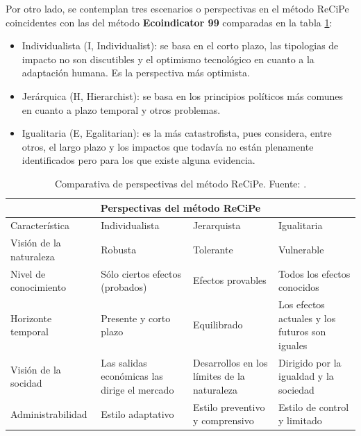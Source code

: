 Por otro lado, se contemplan tres escenarios o perspectivas en el método ReCiPe coincidentes con las del método \textbf{Ecoindicator 99} comparadas en la tabla \ref{perspectivas_recipe}:

\begin{itemize}
  \item Individualista (I, Individualist): se basa en el corto plazo, las tipologias de impacto no son discutibles y el optimismo tecnológico en cuanto a la adaptación humana. Es la perspectiva más optimista.
  \item Jerárquica (H, Hierarchist): se basa en los principios políticos más comunes en cuanto a plazo temporal y otros problemas.
  \item Igualitaria (E, Egalitarian): es la más catastrofista, pues considera, entre otros, el largo plazo y los impactos que todavía no están plenamente identificados pero para los que existe alguna evidencia.
\end{itemize}

\begin{table}[!htb]
\centering
\begin{footnotesize}
\begin{tabular}{p{3.5cm}p{3cm}p{3cm}p{3cm}}
\toprule
\multicolumn{4}{c}{Perspectivas del método ReCiPe}\\
\midrule
Característica & Individualista & Jerarquista & Igualitaria\\
\midrule
Visión de la naturaleza & Robusta & Tolerante & Vulnerable\\
Nivel de conocimiento & Sólo ciertos efectos (probados) & Efectos provables & Todos los efectos conocidos\\
Horizonte temporal & Presente y corto plazo & Equilibrado & Los efectos actuales y los futuros son iguales\\
Visión de la socidad & Las salidas económicas las dirige el mercado & Desarrollos en los límites de la naturaleza & Dirigido por la igualdad y la sociedad\\
Administrabilidad & Estilo adaptativo & Estilo preventivo y comprensivo & Estilo de control y limitado\\
\bottomrule
\end{tabular}
\end{footnotesize}
\caption[Comparativa de perspectivas del método ReCiPe.]{Comparativa de perspectivas del método ReCiPe. Fuente: \cite{schryver}.}
\label{perspectivas_recipe}
\end{table}


